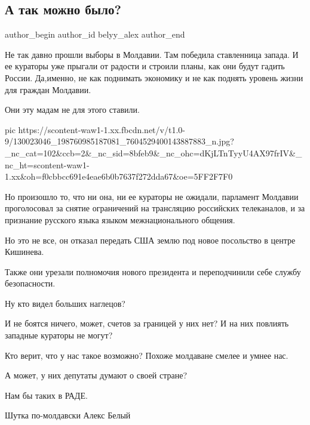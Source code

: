  
 
 
 
 

\subsection{А так можно было?}
\label{sec:05_12_2020.fb.alex_belyy.1.moldavia}

\ifcmt
  author_begin
   author_id belyy_alex
  author_end
\fi

Не так давно прошли выборы в Молдавии. Там победила ставленница запада. И ее
кураторы уже прыгали от радости и строили планы, как они будут гадить России.
Да,именно, не как поднимать экономику и не как поднять уровень жизни для
граждан Молдавии. 

Они эту мадам не для этого ставили.  

\ifcmt
pic https://scontent-waw1-1.xx.fbcdn.net/v/t1.0-9/130023046_198760985187081_7604529400143887883_n.jpg?_nc_cat=102&ccb=2&_nc_sid=8bfeb9&_nc_ohc=dKjLTnTyyU4AX97frIV&_nc_ht=scontent-waw1-1.xx&oh=f0cbbcc691e4eae6b0b7637f272dda67&oe=5FF2F7F0
\fi

Но произошло то, что ни она, ни ее кураторы не ожидали, парламент Молдавии
проголосовал за снятие ограничений на трансляцию российских телеканалов, и за
признание русского языка языком межнационального  общения. 

Но это не все, он отказал передать США землю   под новое посольство в центре
Кишинева.

Также они урезали полномочия нового президента и переподчинили себе службу
безопасности. 

Ну кто видел больших наглецов? 

И не боятся ничего, может, счетов за границей у них нет? И на них повлиять
западные кураторы не могут?

Кто верит, что у нас такое возможно? Похоже молдаване смелее и умнее нас.

А может, у них депутаты думают о своей стране? 

Нам бы таких в РАДЕ.     

Шутка по-молдавски Алекс Белый
